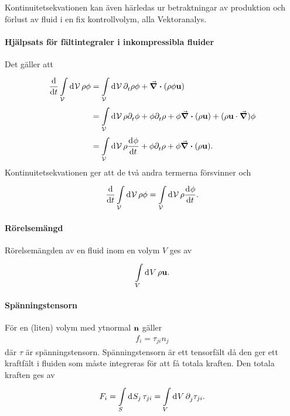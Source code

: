 Kontinuitetsekvationen kan även härledas ur betraktningar av produktion och förlust av fluid i en fix kontrollvolym, alla Vektoranalys.

\paragraph{Hjälpsats för fältintegraler i inkompressibla fluider}
Det gäller att
\begin{align*}
	\dv{t}\int\limits_{\mathcal{V}}^{}\dd[]{\mathcal{V}}\rho\phi &= \int\limits_{\mathcal{V}}^{}\dd[]{\mathcal{V}}\partial_{t}^{}\rho\phi + \div(\rho\phi\vb{u}) \\
	                                               &= \int\limits_{\mathcal{V}}^{}\dd[]{\mathcal{V}}\rho\partial_{t}^{}\phi + \phi\partial_{t}^{}\rho + \phi\div(\rho\vb{u}) + (\rho\vb{u}\cdot\grad)\phi \\
	                                               &= \int\limits_{\mathcal{V}}^{}\dd[]{\mathcal{V}}\rho\dv[]{\phi}{t} + \phi\partial_{t}^{}\rho + \phi\div(\rho\vb{u}).
\end{align*}
Kontinuitetsekvationen ger att de två andra termerna försvinner och
\begin{align*}
	\dv{t}\int\limits_{\mathcal{V}}^{}\dd[]{\mathcal{V}}\rho\phi =\int\limits_{\mathcal{V}}^{}\dd[]{\mathcal{V}}\rho\dv[]{\phi}{t}.
\end{align*}

\paragraph{Rörelsemängd}
Rörelsemängden av en fluid inom en volym $V$ ges av
\begin{align*}
	\int\limits_{V}^{}\dd[]{V}\rho\vb{u}.
\end{align*}

\paragraph{Spänningstensorn}
För en (liten) volym med ytnormal $\vb{n}$ gäller
\begin{align*}
	f_{i} = \tau_{ji}n_{j}
\end{align*}
där $\tau$ är spänningstensorn. Spänningstensorn är ett tensorfält då den ger ett kraftfält i fluiden som måste integreras för att få totala kraften. Den totala kraften ges av
\begin{align*}
	F_{i} = \int\limits_{S}^{}\dd[]{S_{j}}\tau_{ji} = \int\limits_{V}^{}\dd[]{V}\partial_{j}^{}\tau_{ji}.
\end{align*}


